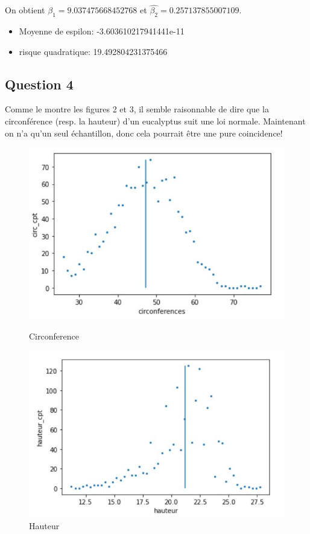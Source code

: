 \documentclass[]{book}
\theoremstyle{definition}
\begin{document}
On obtient $\hat{\beta_1} =  9.037475668452768$  et $\hat{\beta_2} = 0.257137855007109$.

\begin{itemize}
    \item Moyenne de espilon: -3.603610217941441e-11
    \item risque quadratique: 19.492804231375466
\end{itemize}
    
\subsection*{Question 4}
Comme le montre les figures 2 et 3, il semble raisonnable de dire que la circonf\'erence (resp. la hauteur) d'un eucalyptus suit une loi normale. Maintenant on n'a qu'un seul \'echantillon, donc cela pourrait \^etre une pure coincidence!

\begin{figure}
    \centering
    \begin{minipage}{0.45\textwidth}
        \centering
            \includegraphics[scale=0.5]{circ_normale.jpg}
            \caption{Circonference}
            \label{fig:Circonference}
    \end{minipage}\hfill
    \begin{minipage}{0.45\textwidth}
        \centering
        \includegraphics[scale=0.5]{hauteur_normale.jpg}
        \caption{Hauteur}
        \label{fig:Hauteur}
    \end{minipage}
\end{figure}
\end{document}
